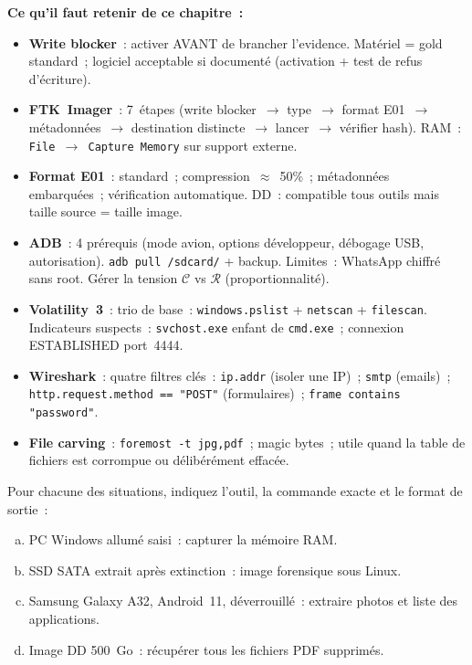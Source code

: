 \begin{boxresume}
\textbf{Ce qu'il faut retenir de ce chapitre~:}
\begin{itemize}
    \item \textbf{Write blocker}~: activer AVANT de brancher l'evidence.
          Matériel = gold standard~; logiciel acceptable si documenté
          (activation + test de refus d'écriture).

    \item \textbf{FTK~Imager}~: 7~étapes (write blocker~$\to$ type~$\to$
          format E01~$\to$ métadonnées~$\to$ destination distincte~$\to$
          lancer~$\to$ vérifier hash). RAM~: \texttt{File~$\to$~Capture
          Memory} sur support externe.

    \item \textbf{Format E01}~: standard~; compression~$\approx$~50\%~;
          métadonnées embarquées~; vérification automatique.
          DD~: compatible tous outils mais taille source = taille image.

    \item \textbf{ADB}~: 4 prérequis (mode avion, options développeur,
          débogage USB, autorisation). \texttt{adb pull /sdcard/} +
          backup. Limites~: WhatsApp chiffré sans root. Gérer
          la tension $\mathcal{C}$ vs $\mathcal{R}$ (proportionnalité).

    \item \textbf{Volatility~3}~: trio de base~: \texttt{windows.pslist}
          + \texttt{netscan} + \texttt{filescan}. Indicateurs suspects~:
          \texttt{svchost.exe} enfant de \texttt{cmd.exe}~; connexion
          ESTABLISHED port~4444.

    \item \textbf{Wireshark}~: quatre filtres clés~: \texttt{ip.addr}
          (isoler une IP)~; \texttt{smtp} (emails)~;
          \texttt{http.request.method == "POST"} (formulaires)~;
          \texttt{frame contains "password"}.

    \item \textbf{File carving}~: \texttt{foremost -t jpg,pdf}~;
          magic bytes~; utile quand la table de fichiers est corrompue
          ou délibérément effacée.
\end{itemize}
\end{boxresume}

\bigskip

\begin{boxexo}[title={\ding{45}\quad Exercice~9.1 --- Choix d'outil \niveaubase}]
Pour chacune des situations, indiquez l'outil, la commande exacte et
le format de sortie~:
\begin{enumerate}[(a)]
    \item PC Windows allumé saisi~: capturer la mémoire RAM.
    \item SSD SATA extrait après extinction~: image forensique sous Linux.
    \item Samsung Galaxy A32, Android~11, déverrouillé~: extraire photos
          et liste des applications.
    \item Image DD 500~Go~: récupérer tous les fichiers PDF supprimés.
\end{enumerate}
\end{boxexo}

